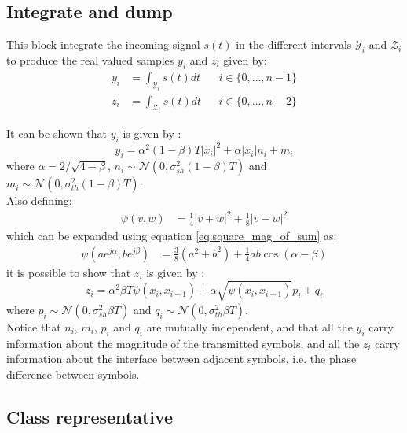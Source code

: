 \subsection{Integrate and dump}

This block integrate the incoming signal $s(t)$ in the different intervals $\mathcal{Y}_i$ and $\mathcal{Z}_i$ to produce the real valued samples $y_i$ and $z_i$ given by:
\begin{align}
	y_i&=\int_{\mathcal Y_i}s(t)dt&&i\in \{0,\dotsc,n-1\}\\
	z_i&=\int_{\mathcal Z_i}s(t)dt&&i\in \{0,\dotsc,n-2\}
\end{align}

It can be shown that $y_i$ is given by \cite{Tasbihi_Tukey}:
\begin{equation}
y_i=\alpha^2(1-\beta)T|x_i|^2+\alpha|x_i|n_i+m_i
	\label{eq:y_i_Tukey}
\end{equation}
where $\alpha=2/\sqrt{4-\beta}$, $n_i\sim\mathcal N(0,\sigma^2_{sh}(1-\beta)T)$ and $m_i\sim\mathcal N(0,\sigma^2_{th}(1-\beta)T)$.\\

Also defining:
\begin{align}
\psi(v,w)&=\frac{1}{4}|v+w|^2 + \frac{1}{8}|v-w|^2
\end{align}
which can be expanded using equation \ref{eq:square_mag_of_sum} as:
\begin{align}
\psi(ae^{j\alpha},be^{j\beta})&=\frac{3}{8}\left(a^2+b^2\right)+\frac{1}{4}ab\cos(\alpha-\beta)
\end{align}
 it is possible to show that $z_i$ is given by \cite{Tasbihi_Tukey}:
\begin{equation}
	z_i=\alpha^2\beta T\psi(x_i,x_{i+1})+\alpha\sqrt{\psi(x_i,x_{i+1})}p_i +q_i
	\label{eq:z_i_Tukey}
\end{equation}
where $p_i\sim\mathcal N(0,\sigma^2_{sh}\beta T)$ and $q_i\sim\mathcal N(0,\sigma^2_{th}\beta T)$.\\

Notice that $n_i$, $m_i$, $p_i$ and $q_i$ are mutually  independent, and that all the $y_i$ carry information about the magnitude of the transmitted symbols, and all the $z_i$ carry information about the interface between adjacent symbols, i.e. the phase difference between symbols.

\subsection{Class representative}

